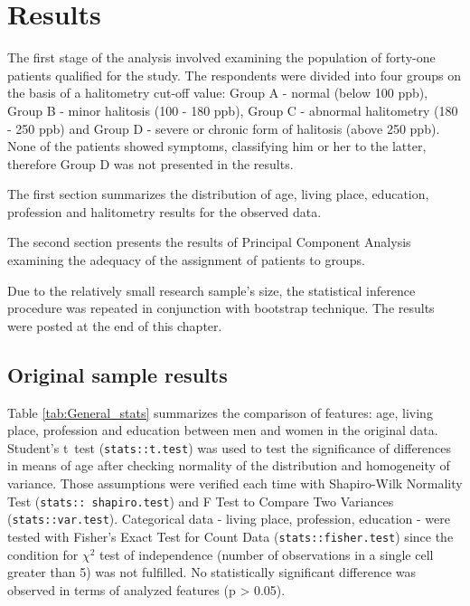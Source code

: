 \documentclass[12pt,a4paper,notitlepage]{report}
\begin{document}
\chapter{Results}

The first stage of the analysis involved examining the population of forty-one patients qualified for the study. The respondents were divided into four groups on the basis of a halitometry cut-off value: Group A - normal (below 100 ppb), Group B - minor halitosis (100 - 180 ppb), Group C - abnormal halitometry (180 - 250 ppb) and Group D - severe or chronic form of halitosis (above 250 ppb).  None of the patients showed symptoms, classifying him or her to the latter, therefore Group D was not presented in the results. 

The first section summarizes the distribution of age, living place, education, profession and halitometry results for the observed data. 

The second section presents the results of Principal Component Analysis examining the adequacy of the assignment of patients to groups.

Due to the relatively small research sample's size, the statistical inference procedure was repeated in conjunction with bootstrap technique. The results were posted at the end of this chapter.

\section{Original sample results}

Table \ref{tab:General_stats} summarizes the comparison of features: age, living place, profession and education between men and women in the original data. Student's \mbox{t test} (\texttt{stats::t.test}) was used to test the significance of differences in means of age after checking normality of the distribution and homogeneity of variance. Those assumptions were verified each time with Shapiro-Wilk Normality Test (\texttt{stats:: shapiro.test}) and F Test to Compare Two Variances (\texttt{stats::var.test}). 
Categorical data - living place, profession, education - were tested with Fisher's Exact Test for Count Data (\texttt{stats::fisher.test}) since the condition for  $\chi^2 $ test of independence (number of observations in a single cell greater than 5) was not fulfilled. 
No statistically significant difference was observed in terms of analyzed features (p > 0.05). 
\end{document}
